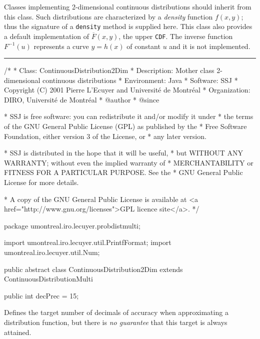 
Classes implementing 2-dimensional continuous distributions should inherit 
from this class.
Such distributions are characterized by a \emph{density} function $f(x, y)$;
thus the signature of a \texttt{density} method is supplied here.
This class also provides a default implementation of $\overline F(x, y)$, 
the upper \texttt{CDF}. The inverse function $F^{-1}(u)$ represents a curve
$y = h(x)$ of constant $u$ and it is not implemented.

\bigskip\hrule

\begin{code}
\begin{hide}
/*
 * Class:        ContinuousDistribution2Dim
 * Description:  Mother class 2-dimensional continuous distributions
 * Environment:  Java
 * Software:     SSJ 
 * Copyright (C) 2001  Pierre L'Ecuyer and Université de Montréal
 * Organization: DIRO, Université de Montréal
 * @author       
 * @since

 * SSJ is free software: you can redistribute it and/or modify it under
 * the terms of the GNU General Public License (GPL) as published by the
 * Free Software Foundation, either version 3 of the License, or
 * any later version.

 * SSJ is distributed in the hope that it will be useful,
 * but WITHOUT ANY WARRANTY; without even the implied warranty of
 * MERCHANTABILITY or FITNESS FOR A PARTICULAR PURPOSE.  See the
 * GNU General Public License for more details.

 * A copy of the GNU General Public License is available at
   <a href="http://www.gnu.org/licenses">GPL licence site</a>.
 */
\end{hide}
package umontreal.iro.lecuyer.probdistmulti;
\begin{hide}
import umontreal.iro.lecuyer.util.PrintfFormat;
import umontreal.iro.lecuyer.util.Num;
\end{hide}

public abstract class ContinuousDistribution2Dim
                          extends ContinuousDistributionMulti\begin{hide} {\end{hide}

   public int decPrec = 15;
\end{code}
\begin{tabb} Defines the target number of decimals of accuracy when
 approximating a distribution function, but there is \emph{no guarantee} that
 this target is always attained.
\end{tabb}

